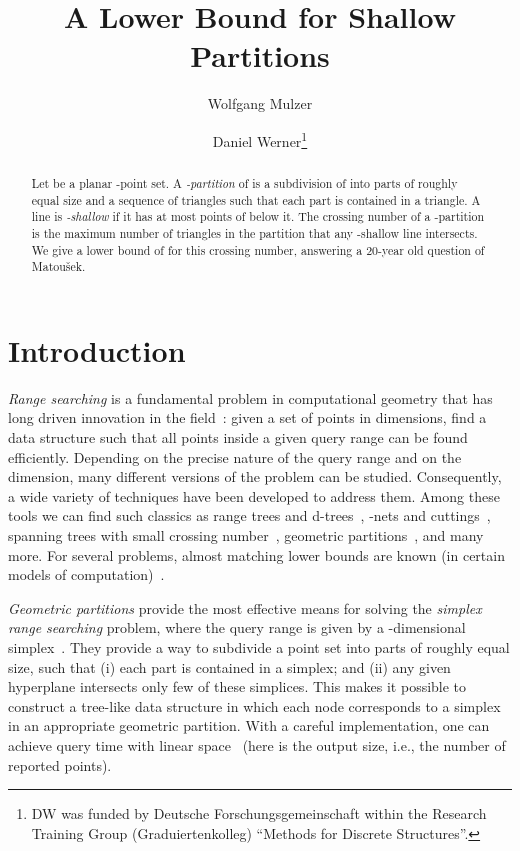 \documentclass{paper}
\title{A Lower Bound for Shallow Partitions}
\author{Wolfgang Mulzer
         \and
        Daniel Werner\thanks{DW was funded by 
	 Deutsche Forschungsgemeinschaft within the Research Training
         Group (Graduiertenkolleg) ``Methods for Discrete Structures''.}
	}
\newcommand\matousek{{Matou{\v{s}}ek}}
\begin{document}
\maketitle

\begin{abstract}
Let  be a planar -point set. A \emph{-partition} of
 is a subdivision of  into  parts of
roughly equal size and a sequence of triangles such that
each part is contained in a triangle. A line is \emph{-shallow} 
if it has at most  points of  below it.
The crossing number of a -partition is the maximum number
of triangles in the partition that any -shallow line intersects.
We give a lower bound of  
for this crossing number, answering a 20-year old question
of \matousek.
\end{abstract}

\section{Introduction}

\emph{Range searching} is a fundamental problem in computational 
geometry that has long driven innovation in the field~\cite{AgarwalEr99}:
given a set of  points in  dimensions, find a data
structure such that all points inside a given query range
can be found efficiently. Depending on the precise
nature of the query range and on the dimension,
many different versions of the problem can be studied. Consequently, 
a wide variety of techniques have been developed to address them. Among these
tools we can find such classics as range trees and
d-trees~\cite[Chapter~5]{deBergChvKrOv08}, 
-nets and cuttings~\cite{Chazelle00}, spanning trees with small 
crossing number~\cite{Welzl92}, 
geometric partitions~\cite{Matousek92b}, and many more. For several problems,
almost matching lower bounds are known (in certain models of 
computation)~\cite{Chazelle00}.

\emph{Geometric partitions} provide the most effective means for solving the
\emph{simplex range searching} problem, where the query range is
given by a -dimensional simplex~\cite{Chan10,Matousek92b}.
They provide a way to subdivide a point set into 
parts of roughly equal size, such that (i) each part is contained in a simplex;
and (ii) any given hyperplane intersects only few of these simplices. 
This makes it possible to construct a tree-like data structure 
in which each node corresponds to a simplex in an appropriate geometric partition.
With a careful implementation, one can achieve query time
 with linear space~\cite{Chan10} (here  is
the output size, i.e., the number of reported points).
\end{document}
